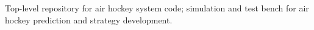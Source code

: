 Top-\/level repository for air hockey system code; simulation and test bench for air hockey prediction and strategy development. 